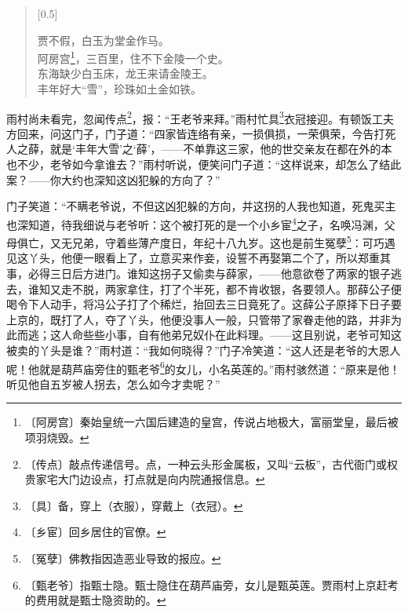 \documentclass[12pt,UTF-8,openany]{ctexbook}
\begin{document}
\begin{normalsize}
    \begin{verse}[0.5\linewidth]
    
    贾不假，白玉为堂金作马。\\阿房宫\footnote{〔阿房宫〕秦始皇统一六国后建造的皇宫，传说占地极大，富丽堂皇，最后被项羽烧毁。}，三百里，住不下金陵一个史。\\东海缺少白玉床，龙王来请金陵王。\\丰年好大“雪”，珍珠如土金如铁。
    
    \end{verse}
    
    雨村尚未看完，忽闻传点\footnote{〔传点〕敲点传递信号。点，一种云头形金属板，又叫“云板”，古代衙门或权贵家宅大门边设点，打点就是向内院通报信息。}，报：“王老爷来拜。”雨村忙具\footnote{〔具〕备，穿上（衣服），穿戴上（衣冠）。}衣冠接迎。有顿饭工夫方回来，问这门子，门子道：“四家皆连络有亲，一损俱损，一荣俱荣，今告打死人之薛，就是‘丰年大雪’之‘薛’，——不单靠这三家，他的世交亲友在都在外的本也不少，老爷如今拿谁去？”雨村听说，便笑问门子道：“这样说来，却怎么了结此案？——你大约也深知这凶犯躲的方向了？”
    
    门子笑道：“不瞒老爷说，不但这凶犯躲的方向，并这拐的人我也知道，死鬼买主也深知道，待我细说与老爷听：这个被打死的是一个小乡宦\footnote{〔乡宦〕回乡居住的官僚。}之子，名唤冯渊，父母俱亡，又无兄弟，守着些薄产度日，年纪十八九岁。这也是前生冤孽\footnote{〔冤孽〕佛教指因造恶业导致的报应。}：可巧遇见这丫头，他便一眼看上了，立意买来作妾，设誓不再娶第二个了，所以郑重其事，必得三日后方进门。谁知这拐子又偷卖与薛家，——他意欲卷了两家的银子逃去，谁知又走不脱，两家拿住，打了个半死，都不肯收银，各要领人。那薛公子便喝令下人动手，将冯公子打了个稀烂，抬回去三日竟死了。这薛公子原择下日子要上京的，既打了人，夺了丫头，他便没事人一般，只管带了家眷走他的路，并非为此而逃；这人命些些小事，自有他弟兄奴仆在此料理。——这且别说，老爷可知这被卖的丫头是谁？”雨村道：“我如何晓得？”门子冷笑道：“这人还是老爷的大恩人呢！他就是葫芦庙旁住的甄老爷\footnote{〔甄老爷〕指甄士隐。甄士隐住在葫芦庙旁，女儿是甄英莲。贾雨村上京赶考的费用就是甄士隐资助的。}的女儿，小名英莲的。”雨村骇然道：“原来是他！听见他自五岁被人拐去，怎么如今才卖呢？”
    

\end{normalsize}
\end{document}

